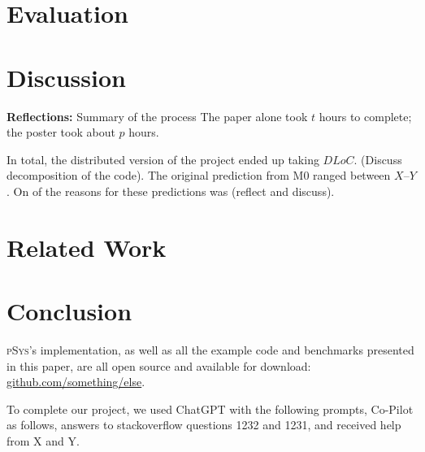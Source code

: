 \documentclass[sigplan, screen, 10pt]{acmart}
\newcommand{\sys}{{\scshape pSys}\xspace}
\begin{document}
\section{Evaluation}
\label{eval}

\section{Discussion}
\label{discussion}

\textbf{Reflections:}
Summary of the process
The paper alone took $t$ hours to complete; the poster took about $p$ hours.

In total, the distributed version of the project ended up taking $DLoC$.
(Discuss decomposition of the code).
The original prediction from M0 ranged between $X$--$Y$. 
On of the reasons for these predictions was (reflect and discuss).


\section{Related Work}
\label{related}

\section{Conclusion}
\label{conclusion}

\sys's implementation, as well as all the example code and benchmarks presented in this paper, are all open source and available for download:
\href{https://github.com/something/else}{github.com/something/else}.

\begin{acks}
To complete our project, we used ChatGPT with the following prompts, Co-Pilot as follows, answers to stackoverflow questions 1232 and 1231, and received help from X and Y.
\end{acks}

{\small

}
\end{document}
